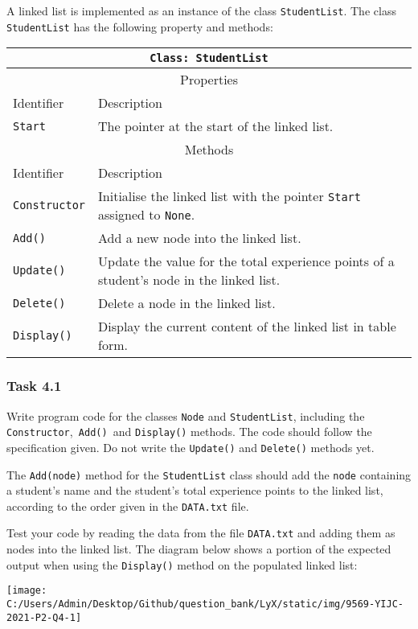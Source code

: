 A linked list is implemented as an instance of the class \texttt{StudentList}.
The class \texttt{StudentList} has the following property and methods: 
\noindent \begin{center}
\begin{tabular}{|l|l|}
\hline 
\multicolumn{2}{|c|}{\texttt{Class: StudentList}}\tabularnewline
\hline 
\multicolumn{2}{|c|}{Properties}\tabularnewline
\hline 
\texttt{\hspace{0.01\columnwidth}}Identifier & \texttt{\hspace{0.05\columnwidth}}Description\tabularnewline
\hline 
\texttt{Start} & The pointer at the start of the linked list.\tabularnewline
\hline 
\multicolumn{2}{|c|}{Methods}\tabularnewline
\hline 
\texttt{\hspace{0.01\columnwidth}}Identifier & \texttt{\hspace{0.05\columnwidth}}Description\tabularnewline
\hline 
\texttt{Constructor} & Initialise the linked list with the pointer \texttt{Start} assigned
to \texttt{None}.\tabularnewline
\hline 
\texttt{Add()} & Add a new node into the linked list.\tabularnewline
\hline 
\texttt{Update()} & Update the value for the total experience points of a student\textquoteright s
node in the linked list.\tabularnewline
\hline 
\texttt{Delete()} & Delete a node in the linked list.\tabularnewline
\hline 
\texttt{Display()} & Display the current content of the linked list in table form.\tabularnewline
\hline 
\end{tabular}
\par\end{center}

\subsubsection*{Task 4.1 }

Write program code for the classes \texttt{Node} and \texttt{StudentList},
including the \texttt{Constructor},\texttt{ Add() }and \texttt{Display()}
methods. The code should follow the specification given. Do not write
the \texttt{Update()} and \texttt{Delete()} methods yet. 

The \texttt{Add(node)} method for the \texttt{StudentList} class should
add the \texttt{node} containing a student\textquoteright s name and
the student\textquoteright s total experience points to the linked
list, according to the order given in the \texttt{DATA.txt} file. 

Test your code by reading the data from the file \texttt{DATA.txt}
and adding them as nodes into the linked list. The diagram below shows
a portion of the expected output when using the \texttt{Display()}
method on the populated linked list: 
\noindent \begin{center}
\texttt{[image: C:/Users/Admin/Desktop/Github/question\_bank/LyX/static/img/9569-YIJC-2021-P2-Q4-1]}
\par\end{center}

